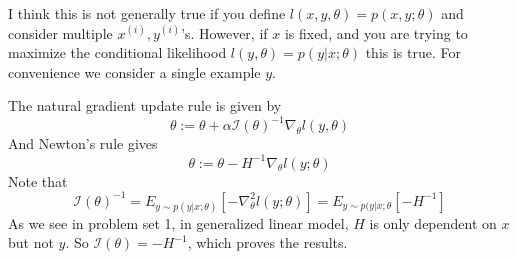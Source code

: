 \begin{answer}
    I think this is not generally true if you define $l(x, y, \theta) = p(x, y;\theta)$ and consider multiple $x^{(i)}, y^{(i)}$'s. However, if $x$ is fixed, and you are trying to maximize the conditional likelihood $l(y, \theta) = p(y|x; \theta)$ this is true. For convenience we consider a single example $y$.

The natural gradient update rule is given by
$$
\theta := \theta+ \alpha \mathcal {I(\theta)}^{-1} \nabla_{\theta}l(y, \theta)
$$
And Newton's rule gives
$$
\theta := \theta - H^{-1}\nabla_{\theta}l(y;\theta)
$$
Note that
$$
\mathcal I(\theta)^{-1} = E_{y\sim p(y|x;\theta)}[-\nabla_{\theta}^2 l(y;\theta)] =  E_{y\sim p(y|x;\theta}[-H^{-1}]
$$
As we see in problem set 1, in generalized linear model, $H$ is only dependent on $x$ but not $y$. So $\mathcal I(\theta) = - H^{-1}$, which proves the results.



\end{answer}
